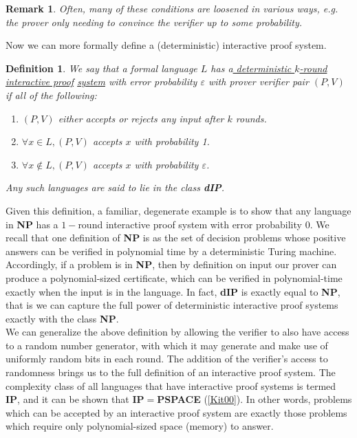 \documentclass[12pt]{article}
\newtheorem{defn}{Definition}
\newtheorem{rmk}{Remark}
\numberwithin{thm}{section}
\numberwithin{defn}{section}
\numberwithin{prop}{section}
\numberwithin{rmk}{section}
\begin{document}
	\begin{rmk} Often, many of these conditions are loosened in various ways, e.g. the prover only needing to convince the verifier up to some probability.\end{rmk}
	
	Now we can more formally define a (deterministic) interactive proof system.\\
	
	\begin{defn}
	We say that a formal language $L$ has a\underline{ deterministic $k$-round interactive proof} \underline{system} with error probability $\varepsilon$ with prover verifier pair $(P,V)$ if all of the following:
	\begin{enumerate}[label=(\roman*)]
		\item $(P,V)$ either accepts or rejects any input after $k$ rounds.
		\item $\forall x\in L, (P,V)$ accepts $x$ with probability 1.
		\item $\forall x\notin L, (P,V)$ accepts $x$ with probability $\varepsilon$.
	\end{enumerate}
	Any such languages are said to lie in the class \textbf{dIP}.
	\end{defn}
	Given this definition, a familiar, degenerate example is to show that any language in \textbf{NP} has a $1-$round interactive proof system with error probability $0$. We recall that one definition of \textbf{NP} is as the set of decision problems whose positive answers can be verified in polynomial time by a deterministic Turing machine. Accordingly, if a problem is in \textbf{NP}, then by definition on input our prover can produce a polynomial-sized certificate, which can be verified in polynomial-time exactly when the input is in the language. In fact, \textbf{dIP} is exactly equal to \textbf{NP}, that is we can capture the full power of deterministic interactive proof systems exactly with the class \textbf{NP}.\\
	
	We can generalize the above definition by allowing the verifier to also have access to a random number generator, with which it may generate and make use of uniformly random bits in each round. The addition of the verifier's access to randomness brings us to the full definition of an interactive proof system. The complexity class of all languages that have interactive proof systems is termed \textbf{IP}, and it can be shown that \textbf{IP}$=$\textbf{PSPACE} (\hyperref[kit00]{[Kit00]}). In other words, problems which can be accepted by an interactive proof system are exactly those problems which require only polynomial-sized space (memory) to answer. 
\end{document}
